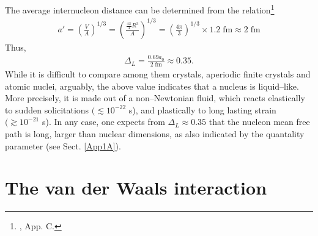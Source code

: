 \begin{subappendices}
The average internucleon distance can be determined from the relation\footnote{\cite{Brink:05}, App. C.}
\begin{align}
a'=\left(\frac{V}{A}\right)^{1/3}=\left(\frac{\frac{4\pi}{3}R^3}{A}\right)^{1/3}=\left(\frac{4\pi}{3}\right)^{1/3}\times 1.2\; \text{fm}\approx 2\;\text{fm}
\end{align} 
Thus,
\begin{align}
\Delta_L=\frac{0.69 a_0}{2\;\text{fm}}\approx0.35.
\end{align} 
While it is difficult to compare among them crystals, aperiodic finite crystals and atomic nuclei, arguably, the above value indicates that a nucleus is liquid--like. More precisely, it is made out of a non--Newtonian fluid, which reacts elastically to sudden so\-li\-ci\-ta\-tions $(\lesssim 10^{-22}$ s),  and plastically to long lasting strain $(\gtrsim 10^{-21}$ s). In any case, one expects from $\Delta_L\approx 0.35$ that the nucleon mean free path is long, larger than nuclear dimensions, as also indicated by the quantality parameter (see Sect. \ref{App1A}). 

\section{The van der Waals interaction}\label{C2AppD}













\end{subappendices}









\newpage
\renewcommand{\bibname}{Bibliography Ch 2}
 
% 
 

